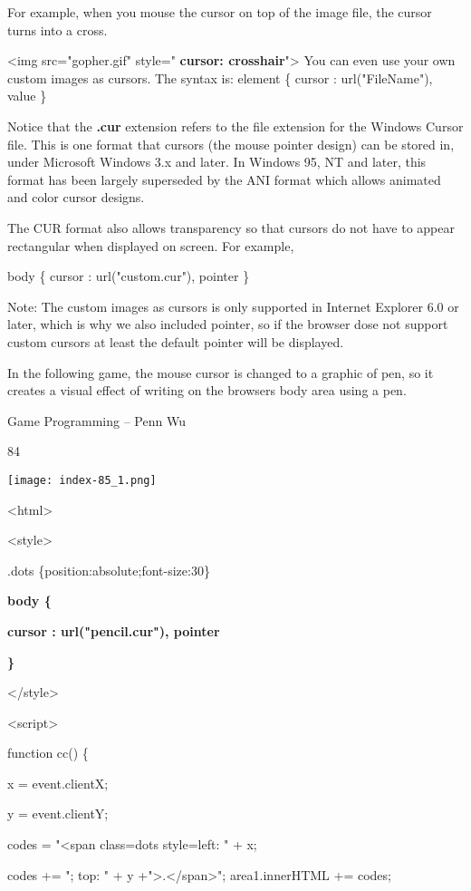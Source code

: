 \documentclass[
]{article}
\begin{document}
For example, when you mouse the cursor on top of the image file, the
cursor turns into a cross.

\textless img src="gopher.gif" style=" \textbf{cursor:
crosshair}"\textgreater{} You can even use your own custom images as
cursors. The syntax is: element \{ cursor : url("FileName"), value \}

Notice that the \textbf{.cur} extension refers to the file extension for
the Windows Cursor file. This is one format that cursors (the mouse
pointer design) can be stored in, under Microsoft Windows 3.x and later.
In Windows 95, NT and later, this format has been largely superseded by
the ANI format which allows animated and color cursor designs.

The CUR format also allows transparency so that cursors do not have to
appear rectangular when displayed on screen. For example,

body \{ cursor : url("custom.cur"), pointer \}

Note: The custom images as cursors is only supported in Internet
Explorer 6.0 or later, which is why we also included pointer, so if the
browser dose not support custom cursors at least the default pointer
will be displayed.

In the following game, the mouse cursor is changed to a graphic of pen,
so it creates a visual effect of writing on the
browser\textquotesingle s body area using a pen.

Game Programming -- Penn Wu

84

\protect\hypertarget{index_split_006.htmlux5cux23p85}{}{}\texttt{[image: index-85\_1.png]}

\textless html\textgreater{}

\textless style\textgreater{}

.dots \{position:absolute;font-size:30\}

\textbf{body \{}

\textbf{cursor : url("pencil.cur"), pointer}

\textbf{\}}

\textless/style\textgreater{}

\textless script\textgreater{}

function cc() \{

x = event.clientX;

y = event.clientY;

codes = "\textless span class=dots style=\textquotesingle left: " + x;

codes += "; top: " + y
+"\textquotesingle\textgreater.\textless/span\textgreater";
area1.innerHTML += codes;
\end{document}
